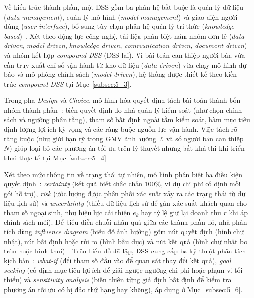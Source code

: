 \documentclass[a4paper]{article}
\begin{document}
Về kiến trúc thành phần, một DSS gồm ba phân hệ bắt buộc là quản lý dữ liệu (\textit{data management}), quản lý mô hình (\textit{model management}) và giao diện người dùng (\textit{user interface}), bổ sung tùy chọn phân hệ quản lý tri thức (\textit{knowledge-based})~\cite{bib:turban_dss}. Xét theo động lực công nghệ, tài liệu phân biệt năm nhóm đơn lẻ (\textit{data-driven}, \textit{model-driven}, \textit{knowledge-driven}, \textit{communication-driven}, \textit{document-driven}) và nhóm kết hợp \textit{compound DSS} (DSS lai). Vì bài toán can thiệp người bán vừa cần truy xuất chỉ số vận hành từ kho dữ liệu (\textit{data-driven}) vừa chạy mô hình dự báo và mô phỏng chính sách (\textit{model-driven}), hệ thống được thiết kế theo kiến trúc \textit{compound DSS} tại Mục~\ref{subsec:5_3}.

Trong pha \textit{Design} và \textit{Choice}, mô hình hóa quyết định tách bài toán thành bốn nhóm thành phần~\cite{bib:turban_dss}: biến quyết định do nhà quản lý kiểm soát (như chọn chính sách và ngưỡng phân tầng), tham số bất định ngoài tầm kiểm soát, hàm mục tiêu định lượng lợi ích kỳ vọng và các ràng buộc nguồn lực vận hành. Việc tách rõ ràng buộc (như giới hạn tỷ trọng GMV ảnh hưởng $X$ và số người bán can thiệp $N$) giúp loại bỏ các phương án tối ưu trên lý thuyết nhưng bất khả thi khi triển khai thực tế tại Mục~\ref{subsec:5_4}.

Xét theo mức thông tin về trạng thái tự nhiên, mô hình phân biệt ba điều kiện quyết định~\cite{bib:turban_dss}: \textit{certainty} (kết quả biết chắc chắn 100\%, ví dụ chi phí cố định mỗi gói hỗ trợ), \textit{risk} (ước lượng được phân phối xác suất xảy ra các trạng thái từ dữ liệu lịch sử) và \textit{uncertainty} (thiếu dữ liệu lịch sử để gán xác suất khách quan cho tham số ngoại sinh, như hiệu lực cải thiện $e_k$ hay tỷ lệ giữ lại doanh thu $r$ khi áp chính sách mới). Để biểu diễn chuỗi nhân quả giữa các thành phần đó, nhà phân tích dùng \textit{influence diagram} (biểu đồ ảnh hưởng) gồm nút quyết định (hình chữ nhật), nút bất định hoặc rủi ro (hình bầu dục) và nút kết quả (hình chữ nhật bo tròn hoặc hình thoi)~\cite{bib:turban_dss}. Trên biểu đồ đã lập, DSS cung cấp ba kỹ thuật phân tích kịch bản~\cite{bib:turban_dss}: \textit{what-if} (đổi tham số đầu vào để quan sát thay đổi kết quả), \textit{goal seeking} (cố định mục tiêu lợi ích để giải ngược ngưỡng chi phí hoặc phạm vi tối thiểu) và \textit{sensitivity analysis} (biến thiên từng giả định bất định để kiểm tra phương án tối ưu có bị đảo thứ hạng hay không), áp dụng ở Mục~\ref{subsec:5_6}.
\end{document}
